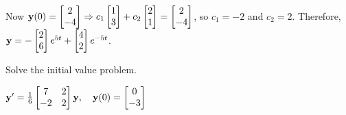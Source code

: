 \documentclass{ximera}
\begin{document}
\begin{problem}
\begin{solution}
Now ${\bf y}(0)= \begin{bmatrix}2\\-4\end{bmatrix}\Rightarrow
c_1 \begin{bmatrix}
1\\3\end{bmatrix}+
c_2 \begin{bmatrix}2\\1\end{bmatrix}= \begin{bmatrix}2\\-4\end{bmatrix}$,
so $c_1=-2$ and $c_2=2$. Therefore,
${\bf y}= -\begin{bmatrix}2\\6\end{bmatrix}e^{5t}+\begin{bmatrix}4\\2\end{bmatrix}e^{-5t}$.
\end{solution}
\end{problem}

\begin{problem}\label{exer:10.4.17}
Solve the initial value problem.

$ {\bf y}'=\frac{1}{6}\begin{bmatrix}7 &2\\-2& 2\end{bmatrix}{\bf y},\quad{\bf
y}(0)= \begin{bmatrix}0\\-3\end{bmatrix}$
\end{problem}
\end{document}

